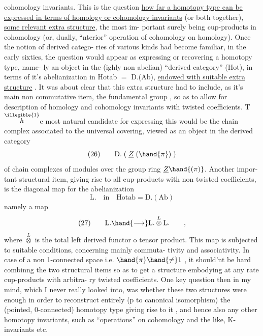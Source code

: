 
cohomology invariants.  This is the question  \uline{how far a homotopy
type can be expressed in terms of homology or cohomology invariants}
(or both together),   \uline{some relevant extra structure},  the most im-%
portant surely being cup-products in cohomology (or, dually, ``nterior''
operation of cohomology on homology).  Once the notion of derived catego-%
ries of various kinds had become familiar,  in the early sixties,  the
question would appear as expressing\hand{,} or recovering\hand{,} a homotopy type,  name-%
ly an object in the (ighly non abelian) ``derived category'' (Hot),  in
terms of it's abelianization in  Hotab $=$ D.(Ab),  \uline{endowed with suitable
extra structure} .  It was about clear that this extra structure had to
include,  as it's main non commutative item,  the fundamental group \inserted{$\pi$},
so as to allow for description of homology and cohomology invariants
with twisted coefficients.  T$\overset{\illegible{1}}{h}$e most natural candidate for expressing
this would be the chain complex associated to the universal covering,
viewed as an object in the derived category
\[ \text{(26)} \qquad \mathrm{D.}\;(\;\underline{Z}\;(\hand{\pi})\;) \]
of chain complexes of modules over the group ring $\underline{Z}\hand{(\pi)}$.  Another impor-%
tant structural item,  giving rise to all cup-products with non twisted
coefficients,  is the diagonal map  for the abelianization
\[ \mathrm{L.}\quad\text{in}\quad \mathrm{Hotab} = \mathrm{D.(Ab)} \]
namely a map
\[ \text{(27)} \qquad \mathrm{L.} \hand{\longrightarrow} \mathrm{L.} \overset{L}{\otimes} \mathrm{L.} \qquad , \]
where $\overset{L}{\otimes}$ is the total left derived functor o tensor product.  This
map is subjected to  suitable  conditions,  concerning mainly commuta-%
tivity and associativity.  In case of a non  1-connected space
i.e. $\hand{\pi} \hand{\neq} 1$ ,  it should'nt be hard combinng the two structural items
so as to get a structure embodying at any rate cup-products with arbitra-%
ry twisted coefficients.   One key question then in my mind,  which I
never really looked into,  was whether these two structures were enough
in order to reconstruct entirely (p to canonical isomorphism) the
(pointed, 0-connected)  homotopy type  giving rise to it ,  and hence
also any other homotopy invariants,  such as ``operations'' on cohomology
and the like,  K-invariants etc.


